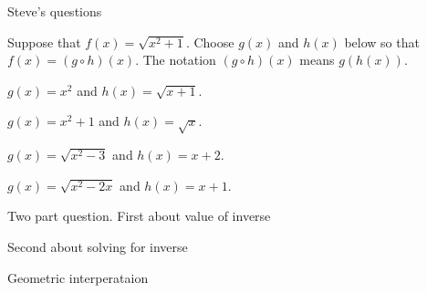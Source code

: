 

\begin{exercise}
Steve's questions
\end{exercise}


\begin{exercise}
Suppose that $f(x) = \sqrt{x^2+1}$. Choose $g(x)$ and $h(x)$ below so that $f(x) = (g\circ h)(x)$. The notation $(g\circ h)(x)$ means $g(h(x))$. 
\begin{multiple-choice}[4]
\item $g(x) = x^2$ and $h(x) = \sqrt{x+1}$.
\item $g(x) = x^2 + 1$ and $h(x) = \sqrt{x}$.
\item $g(x) = \sqrt{x^2 -3}$ and $h(x) = x+2$.
\item $g(x) = \sqrt{x^2 -2x}$ and $h(x) = x+1$. 
\end{multiple-choice}
\end{exercise}


\begin{question}
Two part question.
First about value of inverse

Second about solving for inverse
\end{question}


\begin{question}
Geometric interperataion
\end{question}
